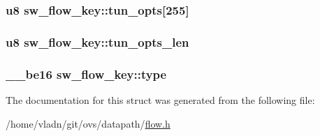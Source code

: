 \subsubsection[{tun\+\_\+opts}]{\setlength{\rightskip}{0pt plus 5cm}u8 sw\+\_\+flow\+\_\+key\+::tun\+\_\+opts\mbox{[}255\mbox{]}}\label{structsw__flow__key_a54b30752817dccb02665a7eecde52a72}
\hypertarget{structsw__flow__key_aef0ea317d3bd0125e0d6390261ba3e2d}{}
\subsubsection[{tun\+\_\+opts\+\_\+len}]{\setlength{\rightskip}{0pt plus 5cm}u8 sw\+\_\+flow\+\_\+key\+::tun\+\_\+opts\+\_\+len}\label{structsw__flow__key_aef0ea317d3bd0125e0d6390261ba3e2d}
\hypertarget{structsw__flow__key_af30defbb2a81c997e8747594e1d937a0}{}
\subsubsection[{type}]{\setlength{\rightskip}{0pt plus 5cm}\+\_\+\+\_\+be16 sw\+\_\+flow\+\_\+key\+::type}\label{structsw__flow__key_af30defbb2a81c997e8747594e1d937a0}


The documentation for this struct was generated from the following file\+:\begin{DoxyCompactItemize}
\item 
/home/vladn/git/ovs/datapath/\hyperlink{flow_8h}{flow.\+h}\end{DoxyCompactItemize}
